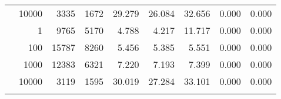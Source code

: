 \begin{table}
\begin{tabular}{rrrrrrrrr}
	            
					 &  
					 
					\multirow{ 1 }{*}{ 10000 } &
					
						
							    
							     3335  & 1672  
	                           & 29.279 & 26.084 & 32.656
	                           & 0.000 & 0.000  \\
	                
	            
	        
				\noalign{\smallskip}\hline
				\multirow{ 4 }{*}{ 500000 } &
				
					
					 
					\multirow{ 1 }{*}{ 1 } &
					
						
							    
							     9765  & 5170  
	                           & 4.788 & 4.217 & 11.717
	                           & 0.000 & 0.000  \\
	                
	            
					 &  
					 
					\multirow{ 1 }{*}{ 100 } &
					
						
							    
							     15787  & 8260  
	                           & 5.456 & 5.385 & 5.551
	                           & 0.000 & 0.000  \\
	                
	            
					 &  
					 
					\multirow{ 1 }{*}{ 1000 } &
					
						
							    
							     12383  & 6321  
	                           & 7.220 & 7.193 & 7.399
	                           & 0.000 & 0.000  \\
	                
	            
					 &  
					 
					\multirow{ 1 }{*}{ 10000 } &
					
						
							    
							     3119  & 1595  
	                           & 30.019 & 27.284 & 33.101
	                           & 0.000 & 0.000  \\
	                
	            
	        
				\noalign{\smallskip}\hline
				\multirow{ 4 }{*}{ 1000000 } &
				

\end{tabular}
\end{table}

